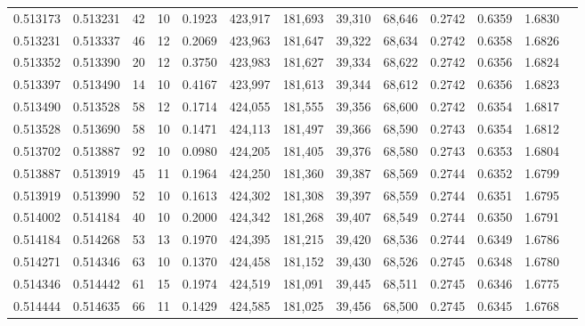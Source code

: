 \begin{tabular}{rrrrrrrrrrrrr}
0.513173 & 0.513231 &    42 &  10 &                                     0.1923 & 423,917 & 181,693 &  39,310 &  68,646 & 0.2742 & 0.6359 & 1.6830 \\
0.513231 & 0.513337 &    46 &  12 &                                     0.2069 & 423,963 & 181,647 &  39,322 &  68,634 & 0.2742 & 0.6358 & 1.6826 \\
0.513352 & 0.513390 &    20 &  12 &                                     0.3750 & 423,983 & 181,627 &  39,334 &  68,622 & 0.2742 & 0.6356 & 1.6824 \\
0.513397 & 0.513490 &    14 &  10 &                                     0.4167 & 423,997 & 181,613 &  39,344 &  68,612 & 0.2742 & 0.6356 & 1.6823 \\
0.513490 & 0.513528 &    58 &  12 &                                     0.1714 & 424,055 & 181,555 &  39,356 &  68,600 & 0.2742 & 0.6354 & 1.6817 \\
0.513528 & 0.513690 &    58 &  10 &                                     0.1471 & 424,113 & 181,497 &  39,366 &  68,590 & 0.2743 & 0.6354 & 1.6812 \\
0.513702 & 0.513887 &    92 &  10 &                                     0.0980 & 424,205 & 181,405 &  39,376 &  68,580 & 0.2743 & 0.6353 & 1.6804 \\
0.513887 & 0.513919 &    45 &  11 &                                     0.1964 & 424,250 & 181,360 &  39,387 &  68,569 & 0.2744 & 0.6352 & 1.6799 \\
0.513919 & 0.513990 &    52 &  10 &                                     0.1613 & 424,302 & 181,308 &  39,397 &  68,559 & 0.2744 & 0.6351 & 1.6795 \\
0.514002 & 0.514184 &    40 &  10 &                                     0.2000 & 424,342 & 181,268 &  39,407 &  68,549 & 0.2744 & 0.6350 & 1.6791 \\
0.514184 & 0.514268 &    53 &  13 &                                     0.1970 & 424,395 & 181,215 &  39,420 &  68,536 & 0.2744 & 0.6349 & 1.6786 \\
0.514271 & 0.514346 &    63 &  10 &                                     0.1370 & 424,458 & 181,152 &  39,430 &  68,526 & 0.2745 & 0.6348 & 1.6780 \\
0.514346 & 0.514442 &    61 &  15 &                                     0.1974 & 424,519 & 181,091 &  39,445 &  68,511 & 0.2745 & 0.6346 & 1.6775 \\
0.514444 & 0.514635 &    66 &  11 &                                     0.1429 & 424,585 & 181,025 &  39,456 &  68,500 & 0.2745 & 0.6345 & 1.6768 \\

\end{tabular}

